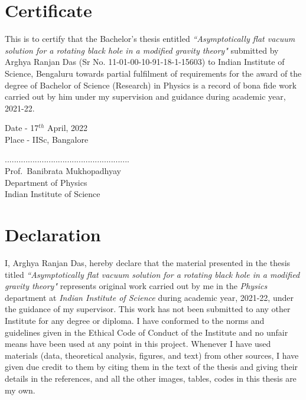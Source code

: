 \documentclass[12pt,a4paper,oneside]{book}
\begin{document}
\chapter*{Certificate}
This is to certify that the Bachelor’s thesis entitled \textit{``Asymptotically flat vacuum solution for a rotating black hole in a modified  gravity theory"}
submitted by Arghya Ranjan Das (Sr No. 11-01-00-10-91-18-1-15603) to Indian Institute of
Science, Bengaluru towards partial fulfilment of requirements for the award of the degree
of Bachelor of Science (Research) in Physics is a record of bona fide work carried out by
him under my supervision and guidance during academic year, 2021-22.
\begin{flushleft}
Date - 17$^{th}$ April, 2022 \\
Place - IISc, Bangalore           
\end{flushleft}
$......................................................$ \\
Prof.\ Banibrata Mukhopadhyay\\
Department of Physics\\
Indian Institute of Science\\


\chapter*{Declaration}
I, Arghya Ranjan Das, hereby declare that the material presented in the thesis titled \textit{``Asymptotically flat vacuum solution for a rotating black hole in a modified  gravity theory"} represents original work carried out by me in the \textit{Physics} department at \textit{Indian Institute of Science} during academic year, 2021-22, under the guidance of my
supervisor. This work has not been submitted to any other Institute for any degree or diploma. I have conformed to the norms and guidelines given in the Ethical Code of Conduct of the Institute and no unfair means have been used at any point in this project. Whenever I have used materials (data, theoretical analysis, figures, and text) from other sources, I have given due credit to them by citing them in the text of the thesis and giving their details in the references, and all the other images, tables, codes in this thesis are my own. 
\end{document}
